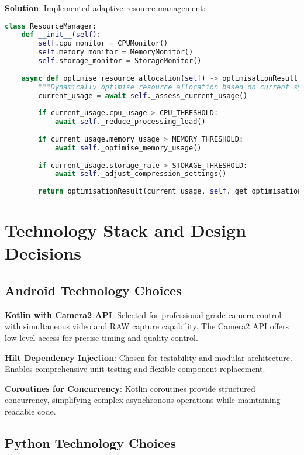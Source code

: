 \documentclass[11pt,a4paper]{report}
\begin{document}
\textbf{Solution}: Implemented adaptive resource management:

\begin{lstlisting}[language=Python]
class ResourceManager:
    def __init__(self):
        self.cpu_monitor = CPUMonitor()
        self.memory_monitor = MemoryMonitor()
        self.storage_monitor = StorageMonitor()
        
    async def optimise_resource_allocation(self) -> optimisationResult:
        """Dynamically optimise resource allocation based on current system state."""
        current_usage = await self._assess_current_usage()
        
        if current_usage.cpu_usage > CPU_THRESHOLD:
            await self._reduce_processing_load()
        
        if current_usage.memory_usage > MEMORY_THRESHOLD:
            await self._optimise_memory_usage()
        
        if current_usage.storage_rate > STORAGE_THRESHOLD:
            await self._adjust_compression_settings()
        
        return optimisationResult(current_usage, self._get_optimisation_actions())
\end{lstlisting}

\section{Technology Stack and Design Decisions}

\subsection{Android Technology Choices}

\textbf{Kotlin with Camera2 API}: Selected for professional-grade camera control with simultaneous video and RAW capture capability. The Camera2 API offers low-level access for precise timing and quality control.

\textbf{Hilt Dependency Injection}: Chosen for testability and modular architecture. Enables comprehensive unit testing and flexible component replacement.

\textbf{Coroutines for Concurrency}: Kotlin coroutines provide structured concurrency, simplifying complex asynchronous operations while maintaining readable code.

\subsection{Python Technology Choices}
\end{document}
